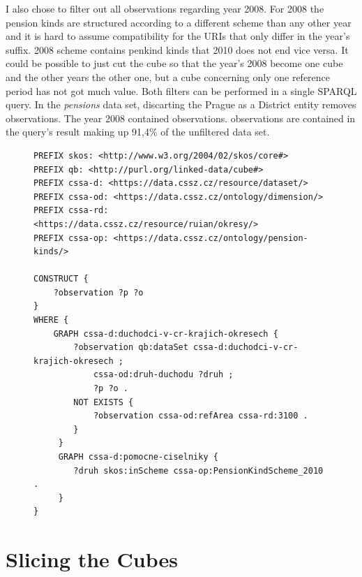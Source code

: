 I also chose to filter out all observations regarding year 2008. For 2008 the pension kinds are structured according to a different scheme than any other year and it is hard to assume compatibility for the URIs that only differ in the year's suffix. 2008 scheme contains penkind kinds that 2010 does not end vice versa. It could be possible to just cut the cube so that the year's 2008 become one cube and the other years the other one, but a cube concerning only one reference period has not got much value. Both filters can be performed in a single SPARQL query. In the \textit{pensions} data set, discarting the Prague as a District entity removes  observations. The year 2008 contained  observations.  observations are contained in the query's result making up 91,4\% of the unfiltered data set.

\begin{figure}[h]
\begin{lstlisting}[language = SPARQL, caption={SPARQL query to filter the \textit{pensions} data set (Source: author)}, label={sparqlexample},captionpos=b escapeinside={(*@}{@*)}]
PREFIX skos: <http://www.w3.org/2004/02/skos/core#>
PREFIX qb: <http://purl.org/linked-data/cube#>
PREFIX cssa-d: <https://data.cssz.cz/resource/dataset/>
PREFIX cssa-od: <https://data.cssz.cz/ontology/dimension/>
PREFIX cssa-rd: <https://data.cssz.cz/resource/ruian/okresy/>
PREFIX cssa-op: <https://data.cssz.cz/ontology/pension-kinds/>

CONSTRUCT {
    ?observation ?p ?o
} 
WHERE {
    GRAPH cssa-d:duchodci-v-cr-krajich-okresech {
        ?observation qb:dataSet cssa-d:duchodci-v-cr-krajich-okresech ;
            cssa-od:druh-duchodu ?druh ;
            ?p ?o .
        NOT EXISTS {
            ?observation cssa-od:refArea cssa-rd:3100 .
        }
     }
     GRAPH cssa-d:pomocne-ciselniky {
        ?druh skos:inScheme cssa-op:PensionKindScheme_2010 .
     }
}
\end{lstlisting}
\end{figure}

\section{Slicing the Cubes\label{cssaSlicing}}

